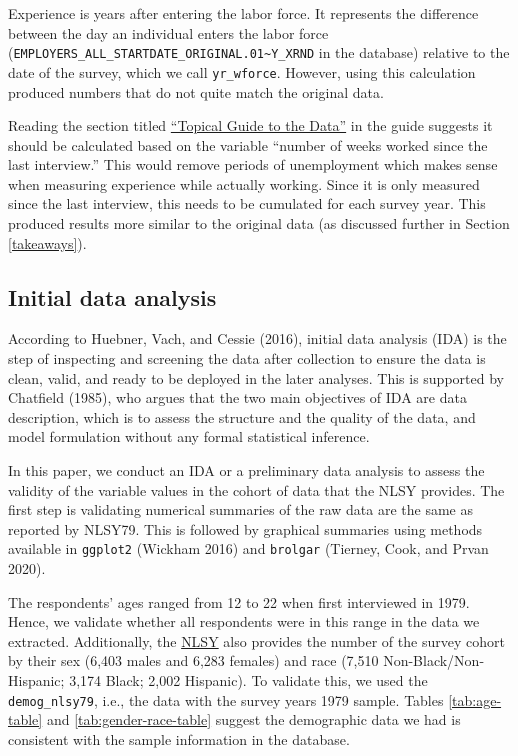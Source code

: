 \documentclass[12pt]{article}
\begin{document}
Experience is years after entering the labor force. It represents the difference between the day an individual enters the labor force (\texttt{EMPLOYERS\_ALL\_STARTDATE\_ORIGINAL.01\textasciitilde{}Y\_XRND} in the database) relative to the date of the survey, which we call \texttt{yr\_wforce}. However, using this calculation produced numbers that do not quite match the original data.

Reading the section titled \href{https://www.nlsinfo.org/content/cohorts/nlsy79/topical-guide/employment/work-experience}{``Topical Guide to the Data''} in the guide suggests it should be calculated based on the variable ``number of weeks worked since the last interview.'' This would remove periods of unemployment which makes sense when measuring experience while actually working. Since it is only measured since the last interview, this needs to be cumulated for each survey year. This produced results more similar to the original data (as discussed further in Section \ref{takeaways}).

\hypertarget{ida}{%
\subsection{Initial data analysis}\label{ida}}

According to Huebner, Vach, and Cessie (2016), initial data analysis (IDA) is the step of inspecting and screening the data after collection to ensure the data is clean, valid, and ready to be deployed in the later analyses. This is supported by Chatfield (1985), who argues that the two main objectives of IDA are data description, which is to assess the structure and the quality of the data, and model formulation without any formal statistical inference.

In this paper, we conduct an IDA or a preliminary data analysis to assess the validity of the variable values in the cohort of data that the NLSY provides. The first step is validating numerical summaries of the raw data are the same as reported by NLSY79. This is followed by graphical summaries using methods available in \texttt{ggplot2} (Wickham 2016) and \texttt{brolgar} (Tierney, Cook, and Prvan 2020).

The respondents' ages ranged from 12 to 22 when first interviewed in 1979. Hence, we validate whether all respondents were in this range in the data we extracted. Additionally, the \href{https://www.nlsinfo.org/content/cohorts/nlsy79/intro-to-the-sample/nlsy79-sample-introduction}{NLSY} also provides the number of the survey cohort by their sex (6,403 males and 6,283 females) and race (7,510 Non-Black/Non-Hispanic; 3,174 Black; 2,002 Hispanic). To validate this, we used the \texttt{demog\_nlsy79}, i.e., the data with the survey years 1979 sample. Tables \ref{tab:age-table} and \ref{tab:gender-race-table} suggest the demographic data we had is consistent with the sample information in the database.
\end{document}
